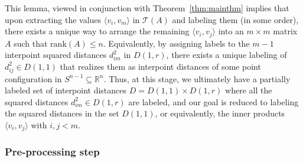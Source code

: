 \documentclass{article}
\theoremstyle{definition}
\renewcommand{\r}{\mathbb{R}}
\newcommand{\ip}[2]{\langle {#1}, {#2} \rangle}
\renewcommand{\|}{|}
\newcommand{\rank}[1]{\mathrm{rank}\left(#1\right)}
\renewcommand{\t}{\mathcal{T}}
\begin{document}
This lemma, viewed in conjunction with Theorem~\ref{thm:mainthm} implies that upon extracting the values $\ip{v_i}{v_m}$ in $\t(A)$ and labeling them (in some order), there exists a unique way to arrange the remaining $\ip{v_i}{v_j}$ into an $m\times m$ matrix $A$ such that $\rank{A}\leq n$. Equivalently, by assigning labels to the $m-1$ interpoint squared distances $d_{im}^2$ in $D(1,r)$, there exists a unique labeling of $d_{ij}^2 \in D(1,1)$ that realizes them as interpoint distances of some point configuration in $S^{n-1}\subseteq \r^n$. Thus, at this stage, we ultimately have a partially labeled set of interpoint distances $D = D(1,1) \times D(1,r)$ where all the squared distances $d_{im}^2 \in D(1,r)$ are labeled, and our goal is reduced to labeling the squared distances in the set $D(1,1)$, or equivalently, the inner products $\ip{v_i}{v_j}$ with $i,j<m$.

\subsubsection{Pre-processing step}
\end{document}
